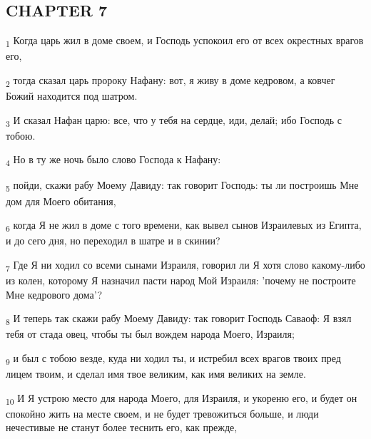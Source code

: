 \subsection{CHAPTER 7}
\begin{tcolorbox}
\textsubscript{1} Когда царь жил в доме своем, и Господь успокоил его от всех окрестных врагов его,
\end{tcolorbox}
\begin{tcolorbox}
\textsubscript{2} тогда сказал царь пророку Нафану: вот, я живу в доме кедровом, а ковчег Божий находится под шатром.
\end{tcolorbox}
\begin{tcolorbox}
\textsubscript{3} И сказал Нафан царю: все, что у тебя на сердце, иди, делай; ибо Господь с тобою.
\end{tcolorbox}
\begin{tcolorbox}
\textsubscript{4} Но в ту же ночь было слово Господа к Нафану:
\end{tcolorbox}
\begin{tcolorbox}
\textsubscript{5} пойди, скажи рабу Моему Давиду: так говорит Господь: ты ли построишь Мне дом для Моего обитания,
\end{tcolorbox}
\begin{tcolorbox}
\textsubscript{6} когда Я не жил в доме с того времени, как вывел сынов Израилевых из Египта, и до сего дня, но переходил в шатре и в скинии?
\end{tcolorbox}
\begin{tcolorbox}
\textsubscript{7} Где Я ни ходил со всеми сынами Израиля, говорил ли Я хотя слово какому-либо из колен, которому Я назначил пасти народ Мой Израиля: 'почему не построите Мне кедрового дома'?
\end{tcolorbox}
\begin{tcolorbox}
\textsubscript{8} И теперь так скажи рабу Моему Давиду: так говорит Господь Саваоф: Я взял тебя от стада овец, чтобы ты был вождем народа Моего, Израиля;
\end{tcolorbox}
\begin{tcolorbox}
\textsubscript{9} и был с тобою везде, куда ни ходил ты, и истребил всех врагов твоих пред лицем твоим, и сделал имя твое великим, как имя великих на земле.
\end{tcolorbox}
\begin{tcolorbox}
\textsubscript{10} И Я устрою место для народа Моего, для Израиля, и укореню его, и будет он спокойно жить на месте своем, и не будет тревожиться больше, и люди нечестивые не станут более теснить его, как прежде,
\end{tcolorbox}
